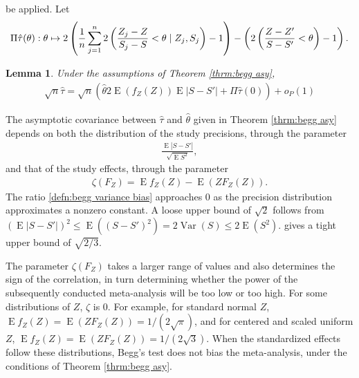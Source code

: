 \documentclass[12pt]{article}
\newtheorem{lemma}[theorem]{Lemma}
\newcommand{\z}{Z}
\newcommand{\s}{S}
\newcommand{\zdiff}{\zeta}
\DeclareMathOperator{\E}{E}
\let\P\relax
\DeclareMathOperator{\P}{P}
\DeclareMathOperator{\var}{Var}
\begin{document}
be applied. Let
\begin{align}
  \Pi\hat\tau(\theta):\theta\mapsto
  2\left(\frac{1}{n}\sum_{j=1}^n2\P\left(\frac{\z_j-\z}{\s_j-\s}<\theta \mid \z_j,\s_j\right)-1\right) - \left(2\P\left(\frac{\z-\z'}{\s-\s'}<\theta\right)-1\right).
\end{align}
\begin{lemma} Under the assumptions of Theorem \ref{thrm:begg asy},
  \begin{align}
    \sqrt{n}\hat\tau = \sqrt{n}\left(\hat\theta 2\E(f_\z(\z))\E|\s-\s'| + \Pi\hat\tau(0) \right) + o_P(1)
  \end{align}
\end{lemma}



The asymptotic covariance between $\hat\tau$ and $\hat\theta$ given in
Theorem \ref{thrm:begg asy} depends on both the distribution of the
study precisions, through the parameter
\begin{align}\label{defn:begg variance bias}
  \frac{\E|\s-\s'|}{\sqrt{\E\s^2}},
\end{align}
and that of the study effects, through the parameter
\begin{align}\label{defn:begg effect bias}
  \zdiff(F_\z) = \E f_\z(\z)-\E(\z F_\z(\z)).
\end{align}
The ratio \eqref{defn:begg variance bias} approaches $0$ as the
precision distribution approximates a nonzero constant. A loose upper
bound of $\sqrt{2}$ follows from
$(\E|\s-\s'|)^2 \le \E((\s-\s')^2) = 2\var(\s) \le 2\E(\s^2)$.
\citet{michael:inpress-a} gives a tight upper bound of $\sqrt{2/3}$.
 
The parameter $\zdiff(F_\z)$ takes a larger range of values and also
determines the sign of the correlation, in turn determining whether
the power of the subsequently conducted meta-analysis will be too low
or too high. For some distributions of $\z$, $\zdiff$ is $0$. For
example, for standard normal $\z$,
$\E f_\z(\z)=\E(\z F_\z(\z))=1/(2\sqrt{\pi})$, and for centered and
scaled uniform $\z$, $\E f_\z(\z)=\E(\z F_\z(\z))=1/(2\sqrt{3})$. When
the standardized effects follow these distributions, Begg's test does
not bias the meta-analysis, under the conditions of Theorem
\ref{thrm:begg asy}.
\end{document}
